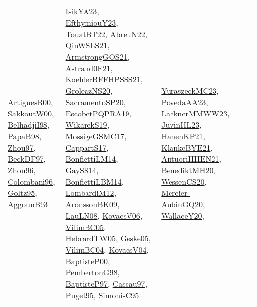 {\begin{longtable}{lp{3cm}>{\raggedright}p{6cm}>{\raggedright}p{6cm}p{8cm}}
\href{articles/ArtiguesR00.pdf}{ArtiguesR00}\cite{ArtiguesR00}, \href{articles/SakkoutW00.pdf}{SakkoutW00}\cite{SakkoutW00}, \href{articles/BelhadjiI98.pdf}{BelhadjiI98}\cite{BelhadjiI98}, \href{articles/PapaB98.pdf}{PapaB98}\cite{PapaB98}, \href{articles/Zhou97.pdf}{Zhou97}\cite{Zhou97}, \href{papers/BeckDF97.pdf}{BeckDF97}\cite{BeckDF97}, \href{papers/Zhou96.pdf}{Zhou96}\cite{Zhou96}, \href{papers/Colombani96.pdf}{Colombani96}\cite{Colombani96}, \href{papers/Goltz95.pdf}{Goltz95}\cite{Goltz95}, \href{articles/AggounB93.pdf}{AggounB93}\cite{AggounB93} & \href{articles/IsikYA23.pdf}{IsikYA23}\cite{IsikYA23}, \href{papers/EfthymiouY23.pdf}{EfthymiouY23}\cite{EfthymiouY23}, \href{papers/TouatBT22.pdf}{TouatBT22}\cite{TouatBT22}, \href{articles/AbreuN22.pdf}{AbreuN22}\cite{AbreuN22}, \href{articles/QinWSLS21.pdf}{QinWSLS21}\cite{QinWSLS21}, \href{papers/ArmstrongGOS21.pdf}{ArmstrongGOS21}\cite{ArmstrongGOS21}, \href{papers/Astrand0F21.pdf}{Astrand0F21}\cite{Astrand0F21}, \href{articles/KoehlerBFFHPSSS21.pdf}{KoehlerBFFHPSSS21}\cite{KoehlerBFFHPSSS21}, \href{papers/GroleazNS20.pdf}{GroleazNS20}\cite{GroleazNS20}, \href{articles/SacramentoSP20.pdf}{SacramentoSP20}\cite{SacramentoSP20}, \href{articles/EscobetPQPRA19.pdf}{EscobetPQPRA19}\cite{EscobetPQPRA19}, \href{articles/WikarekS19.pdf}{WikarekS19}\cite{WikarekS19}, \href{papers/MossigeGSMC17.pdf}{MossigeGSMC17}\cite{MossigeGSMC17}, \href{papers/CappartS17.pdf}{CappartS17}\cite{CappartS17}, \href{papers/BonfiettiLM14.pdf}{BonfiettiLM14}\cite{BonfiettiLM14}, \href{papers/GaySS14.pdf}{GaySS14}\cite{GaySS14}, \href{articles/BonfiettiLBM14.pdf}{BonfiettiLBM14}\cite{BonfiettiLBM14}, \href{articles/LombardiM12.pdf}{LombardiM12}\cite{LombardiM12}, \href{papers/AronssonBK09.pdf}{AronssonBK09}\cite{AronssonBK09}, \href{papers/LauLN08.pdf}{LauLN08}\cite{LauLN08}, \href{papers/KovacsV06.pdf}{KovacsV06}\cite{KovacsV06}, \href{articles/VilimBC05.pdf}{VilimBC05}\cite{VilimBC05}, \href{papers/HebrardTW05.pdf}{HebrardTW05}\cite{HebrardTW05}, \href{papers/Geske05.pdf}{Geske05}\cite{Geske05}, \href{papers/VilimBC04.pdf}{VilimBC04}\cite{VilimBC04}, \href{papers/KovacsV04.pdf}{KovacsV04}\cite{KovacsV04}, \href{articles/BaptisteP00.pdf}{BaptisteP00}\cite{BaptisteP00}, \href{papers/PembertonG98.pdf}{PembertonG98}\cite{PembertonG98}, \href{papers/BaptisteP97.pdf}{BaptisteP97}\cite{BaptisteP97}, \href{papers/Caseau97.pdf}{Caseau97}\cite{Caseau97}, \href{papers/Puget95.pdf}{Puget95}\cite{Puget95}, \href{papers/SimonisC95.pdf}{SimonisC95}\cite{SimonisC95} & \href{papers/YuraszeckMC23.pdf}{YuraszeckMC23}\cite{YuraszeckMC23}, \href{papers/PovedaAA23.pdf}{PovedaAA23}\cite{PovedaAA23}, \href{articles/LacknerMMWW23.pdf}{LacknerMMWW23}\cite{LacknerMMWW23}, \href{papers/JuvinHL23.pdf}{JuvinHL23}\cite{JuvinHL23}, \href{papers/HanenKP21.pdf}{HanenKP21}\cite{HanenKP21}, \href{papers/KlankeBYE21.pdf}{KlankeBYE21}\cite{KlankeBYE21}, \href{papers/AntuoriHHEN21.pdf}{AntuoriHHEN21}\cite{AntuoriHHEN21}, \href{articles/BenediktMH20.pdf}{BenediktMH20}\cite{BenediktMH20}, \href{papers/WessenCS20.pdf}{WessenCS20}\cite{WessenCS20}, \href{papers/Mercier-AubinGQ20.pdf}{Mercier-AubinGQ20}\cite{Mercier-AubinGQ20}, \href{articles/WallaceY20.pdf}{WallaceY20}\cite{WallaceY20}, 
\end{longtable}}
